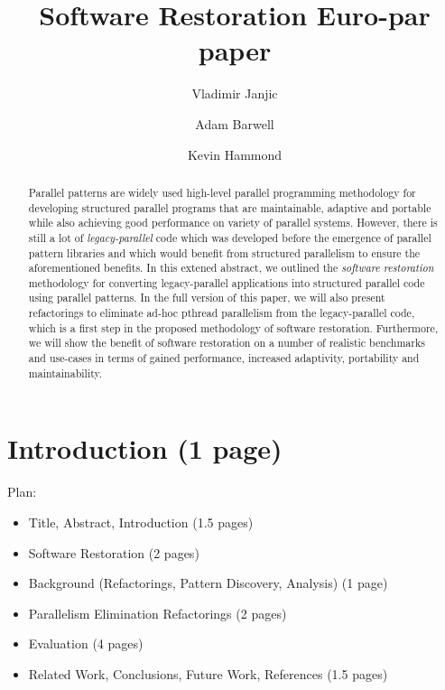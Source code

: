 \documentclass{llncs}
\begin{document}
\title{Software Restoration Euro-par paper}


\author{Vladimir Janjic \and Adam Barwell \and Kevin Hammond}


\maketitle


\begin{abstract}
    Parallel patterns are widely used high-level parallel programming methodology for developing structured parallel programs that are maintainable, adaptive and portable while also achieving good performance on variety of parallel systems. However, there is still a lot of \emph{legacy-parallel} code which was developed before the emergence of parallel pattern libraries and which would benefit from structured parallelism to ensure the aforementioned benefits. 
    In this extened abstract, we outlined the \emph{software restoration} methodology for converting legacy-parallel applications into structured parallel code using parallel patterns. In the full version of this paper, we will also present refactorings to eliminate ad-hoc pthread parallelism from the legacy-parallel code, which is a first step in the proposed methodology of software restoration. Furthermore, we will show the benefit of software restoration on a number of realistic benchmarks and use-cases in terms of gained performance, increased adaptivity, portability and maintainability. 
\end{abstract}


\section{Introduction (1 page)}

Plan:

\begin{itemize}
\item Title, Abstract, Introduction (1.5 pages)
\item Software Restoration (2 pages)
\item Background (Refactorings, Pattern Discovery, Analysis) (1 page)
\item Parallelism Elimination Refactorings (2 pages)
\item Evaluation (4 pages)
\item Related Work, Conclusions, Future Work, References (1.5 pages)
\end{itemize}
\end{document}
